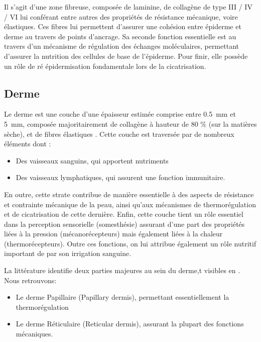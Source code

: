 \addtocounter{footnote}{1}

Il s’agit d’une zone fibreuse, composée de laminine, de collagène de type III / IV / VI lui conférant entre autres des propriétés de résistance mécanique, voire élastiques. Ces fibres lui permettent d’assurer une cohésion entre épiderme et derme au travers de points d’ancrage. Sa seconde fonction essentielle est au travers d’un mécanisme de régulation des échanges moléculaires, permettant d’assurer la nutrition des cellules de base de l’épiderme. Pour finir, elle possède un rôle de ré épidermisation fondamentale lors de la cicatrisation.\par
\clearpage

\subsection{Derme}
Le derme est une couche d’une épaisseur estimée comprise entre \SI{0,5}{\milli\metre} et \SI{5}{\milli\metre}, composée majoritairement de collagène à hauteur de 80 \% (sur la matières sèche), et de fibres élastiques \cite{McGrath2010}. Cette couche est traversée par de nombreux éléments dont : 

\begin{itemize}
\item Des vaisseaux sanguins, qui apportent nutriments
\item Des vaisseaux lymphatiques, qui assurent une fonction immunitaire.
\end{itemize}\par

En outre, cette strate contribue de manière essentielle à des aspects de résistance et contrainte mécanique de la peau, ainsi qu’aux mécanismes de thermorégulation et de cicatrisation de cette dernière. Enfin, cette couche tient un rôle essentiel dans la perception sensorielle (somesthésie) assurant d’une part des propriétés liées à la pression (mécanorécepteurs) mais également liées à la chaleur (thermorécepteurs). Outre ces fonctions, on lui attribue également un rôle nutritif important de par son irrigation sanguine.\par
La littérature identifie deux parties majeures au sein du derme,t visibles en . Nous retrouvons:
\begin{itemize}
\item Le derme Papillaire (Papillary dermis), permettant essentiellement la thermorégulation
\item Le derme Réticulaire (Reticular dermis), assurant la plupart des fonctions mécaniques.
\end{itemize}\par

